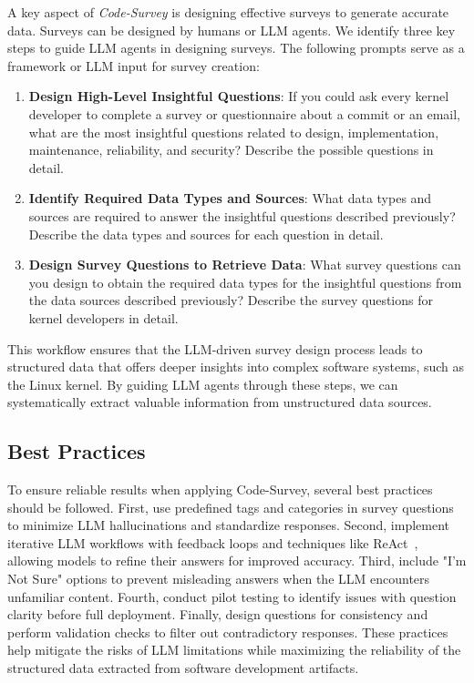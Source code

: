 A key aspect of \emph{Code-Survey} is designing effective surveys to generate accurate data. Surveys can be designed by humans or LLM agents. We identify three key steps to guide LLM agents in designing surveys. The following prompts serve as a framework or LLM input for survey creation:

\begin{enumerate}
    \item \textbf{Design High-Level Insightful Questions}: If you could ask every kernel developer to complete a survey or questionnaire about a commit or an email, what are the most insightful questions related to design, implementation, maintenance, reliability, and security? Describe the possible questions in detail.

    \item \textbf{Identify Required Data Types and Sources}: What data types and sources are required to answer the insightful questions described previously? Describe the data types and sources for each question in detail.

    \item \textbf{Design Survey Questions to Retrieve Data}: What survey questions can you design to obtain the required data types for the insightful questions from the data sources described previously? Describe the survey questions for kernel developers in detail.

\end{enumerate}

This workflow ensures that the LLM-driven survey design process leads to structured data that offers deeper insights into complex software systems, such as the Linux kernel. By guiding LLM agents through these steps, we can systematically extract valuable information from unstructured data sources.

\subsection{Best Practices}

To ensure reliable results when applying Code-Survey, several best practices should be followed. First, use predefined tags and categories in survey questions to minimize LLM hallucinations and standardize responses. Second, implement iterative LLM workflows with feedback loops and techniques like ReAct~\cite{yao2022react}, allowing models to refine their answers for improved accuracy. Third, include "I'm Not Sure" options to prevent misleading answers when the LLM encounters unfamiliar content. Fourth, conduct pilot testing to identify issues with question clarity before full deployment. Finally, design questions for consistency and perform validation checks to filter out contradictory responses. These practices help mitigate the risks of LLM limitations while maximizing the reliability of the structured data extracted from software development artifacts.
